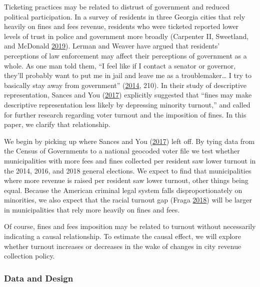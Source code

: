 \documentclass[
  12pt,
]{article}
\begin{document}
Ticketing practices may be related to distrust of government and reduced political participation. In a survey of residents in three Georgia cities that rely heavily on fines and fees revenue, residents who were ticketed reported lower levels of trust in police and government more broadly (Carpenter II, Sweetland, and McDonald \protect\hyperlink{ref-CarpenterII2019}{2019}). Lerman and Weaver have argued that residents' perceptions of law enforcement may affect their perceptions of government as a whole. As one man told them, ``I feel like if I contact a senator or governor, they'll probably want to put me in jail and leave me as a troublemaker\ldots{} I try to basically stay away from government'' (\protect\hyperlink{ref-Lerman2014}{2014}, 210). In their study of descriptive representation, Sances and You (\protect\hyperlink{ref-Sances2017}{2017}) explicitly suggested that ``fines may make descriptive representation less likely by depressing minority turnout,'' and called for further research regarding voter turnout and the imposition of fines. In this paper, we clarify that relationship.

We begin by picking up where Sances and You (\protect\hyperlink{ref-Sances2017}{2017}) left off. By tying data from the Census of Governments to a national geocoded voter file we test whether municipalities with more fees and fines collected per resident saw lower turnout in the 2014, 2016, and 2018 general elections. We expect to find that municipalities where more revenue is raised per resident saw lower turnout, other things being equal. Because the American criminal legal system falls disproportionately on minorities, we also expect that the racial turnout gap (Fraga \protect\hyperlink{ref-Fraga2018}{2018}) will be larger in municipalities that rely more heavily on fines and fees.

Of course, fines and fees imposition may be related to turnout without necessarily indicating a causal relationship. To estimate the causal effect, we will explore whether turnout increases or decreases in the wake of changes in city revenue collection policy.

\hypertarget{data-and-design}{%
\subsubsection*{Data and Design}\label{data-and-design}}
\end{document}

